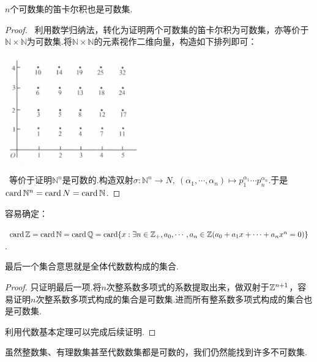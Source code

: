 \begin{proposition}
	$n$个可数集的笛卡尔积也是可数集.
\end{proposition}
\begin{proof}
	~利用数学归纳法，转化为证明两个可数集的笛卡尔积为可数集，亦等价于$\mathbb{N} \times \mathbb{N}$为可数集.将$\mathbb{N} \times \mathbb{N}$的元素视作二维向量，构造如下排列即可：
	\begin{center}
		\includegraphics[width=6cm]{attachment/iShot_2023-08-04_15.19.06.png}
	\end{center}
	
	~等价于证明$\mathbb{N}^n$是可数的.构造双射$\sigma :\mathbb{N}^n \to N,~(\alpha _1, \cdots ,\alpha _n) \mapsto p_1^{\alpha _1} \cdots p_n^{\alpha _n}$.于是$\operatorname{card} \mathbb{N}^n = \operatorname{card} N = \operatorname{card} \mathbb{N}$.
\end{proof}

容易确定：

\begin{proposition}
	$\operatorname{card} \mathbb{Z} = \operatorname{card} \mathbb{N} = \operatorname{card} \mathbb{Q} = \operatorname{card} \{ x:\exists n \in \mathbb{Z}_+,a_0, \cdots ,a_n \in \mathbb{Z}(a_0+a_1x+\cdots +a_nx^n=0) \}$.
\end{proposition}
\begin{remark}
	最后一个集合意思就是全体代数数构成的集合.
\end{remark}
\begin{proof}
	只证明最后一项.将$n$次整系数多项式的系数提取出来，做双射于$\mathbb{Z} ^{n+1}$，容易证明$n$次整系数多项式构成的集合是可数集.进而所有整系数多项式构成的集合也是可数集.
	
	利用代数基本定理可以完成后续证明.
\end{proof}

虽然整数集、有理数集甚至代数数集都是可数的，我们仍然能找到许多不可数集.

